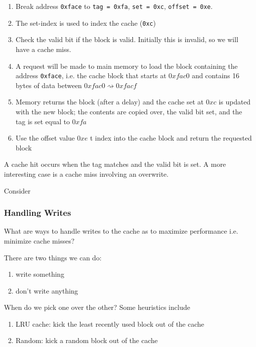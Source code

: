 \documentclass[../notes.tex]{subfiles}
\begin{document}
\begin{definition}
\begin{example}
	\begin{enumerate}
		\item Break address \texttt{0xface} to \texttt{tag = 0xfa}, \texttt{set = 0xc}, \texttt{offset = 0xe}.
		\item The set-index is used to index the cache (\texttt{0xc})
		\item Check the valid bit if the block is valid. Initially this is invalid, so we will have a cache miss.
		\item A request will be made to main memory to load the block containing the address \texttt{0xface}, i.e. the cache block that starts at $ 0xfac0 $ and contains 16 bytes of data between $ 0xfac0 \rightsquigarrow 0xfacf  $
		\item Memory returns the block (after a delay) and the cache set at $ 0xc $ is updated with the new block; the contents are copied over, the valid bit set, and the tag is set equal to $ 0xfa $
		\item Use the offset value $ 0xe $ t index into the cache block and return the requested block
	\end{enumerate}


	A cache hit occurs when the tag matches and the valid bit is set. A more interesting case is a cache miss involving an overwrite.

	Consider 

	






	
\end{example}

\end{definition}






\subsubsection{Handling Writes}

What are ways to handle writes to the cache as to maximize performance i.e. minimize cache misses?


There are two things we can do:
\begin{enumerate}
	\item write something
	\item don't write anything
\end{enumerate}

When do we pick one over the other? Some heuristics include


\begin{enumerate}
	\item  LRU cache: kick the least recently used block out of the cache
	\item Random: kick a random block out of the cache
\end{enumerate}
\end{document}
